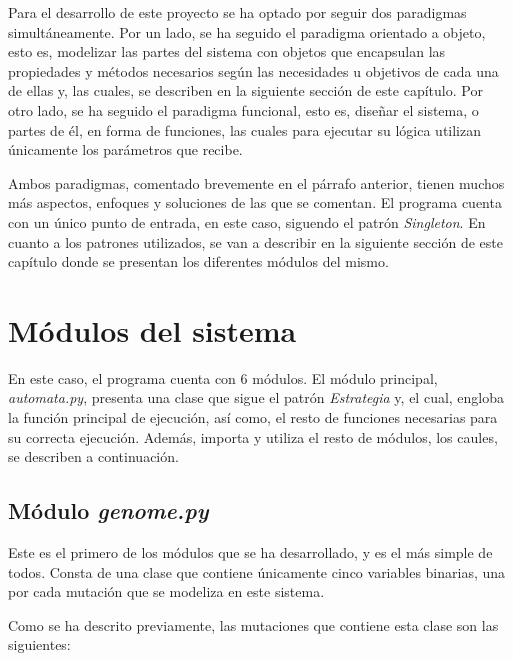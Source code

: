 Para el desarrollo de este proyecto se ha optado por seguir dos paradigmas simultáneamente. Por un lado,
se ha seguido el paradigma orientado a objeto, esto es, modelizar las partes del sistema con objetos que encapsulan
las propiedades y métodos necesarios según las necesidades u objetivos de cada una de ellas y, las cuales,
se describen en la siguiente sección de este capítulo. Por otro lado, se ha seguido el paradigma funcional, esto es,
diseñar el sistema, o partes de él, en forma de funciones, las cuales para ejecutar su lógica utilizan únicamente
los parámetros que recibe.

Ambos paradigmas, comentado brevemente en el párrafo anterior, tienen muchos más aspectos, enfoques y soluciones
de las que se comentan. El programa cuenta con un único punto de entrada, en este caso, siguendo el patrón
\textit{Singleton}. En cuanto a los patrones utilizados, se van a describir en la siguiente sección de este
capítulo donde se presentan los diferentes módulos del mismo.

\section{Módulos del sistema}

En este caso, el programa cuenta con 6 módulos. El módulo principal, \textit{automata.py}, presenta
una clase que sigue el patrón \textit{Estrategia} y, el cual, engloba la función principal de ejecución,
así como, el resto de funciones necesarias para su correcta ejecución. Además, importa y utiliza
el resto de módulos, los caules, se describen a continuación.

\subsection{Módulo \textit{genome.py}}

Este es el primero de los módulos que se ha desarrollado, y es el más simple de todos. Consta de
una clase que contiene únicamente cinco variables binarias, una por cada mutación que se
modeliza en este sistema.

Como se ha descrito previamente, las mutaciones que contiene esta clase son las siguientes:

